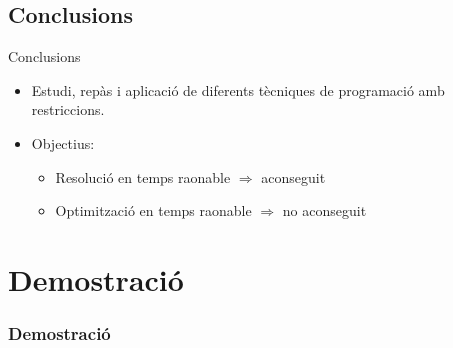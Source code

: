 \documentclass[11pt]{beamer}
\begin{document}
  \subsection{Conclusions}

  
  \begin{frame}{Conclusions}
    \begin{itemize}
      \item Estudi, repàs i aplicació de diferents tècniques de programació amb restriccions.
      \item Objectius:
      \begin{itemize}
        \item Resolució en temps raonable $\Rightarrow$ aconseguit
        \item Optimització en temps raonable  $\Rightarrow$ no aconseguit
      \end{itemize}

    \end{itemize}

  \end{frame}


  \section{Demostració}
  \begin{frame}
    \frametitle{Demostració}
  \end{frame}




  
\end{document}
